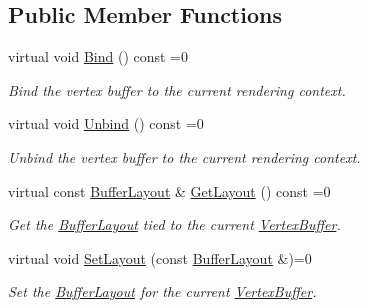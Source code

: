 \subsection*{Public Member Functions}
\begin{DoxyCompactItemize}
\item 
virtual void \hyperlink{classengine_1_1renderer_1_1VertexBuffer_a62c7bd816aa10b69d1e903918ecc4414}{Bind} () const =0
\begin{DoxyCompactList}\small\item\em Bind the vertex buffer to the current rendering context. \end{DoxyCompactList}\item 
virtual void \hyperlink{classengine_1_1renderer_1_1VertexBuffer_a06b240b93506dfd383b3a3f8947eb26f}{Unbind} () const =0
\begin{DoxyCompactList}\small\item\em Unbind the vertex buffer to the current rendering context. \end{DoxyCompactList}\item 
\mbox{\label{classengine_1_1renderer_1_1VertexBuffer_a3186b40aa8c8c471fe80c29645859aa5}} 
virtual const \hyperlink{classengine_1_1renderer_1_1BufferLayout}{Buffer\+Layout} \& \hyperlink{classengine_1_1renderer_1_1VertexBuffer_a3186b40aa8c8c471fe80c29645859aa5}{Get\+Layout} () const =0
\begin{DoxyCompactList}\small\item\em Get the \hyperlink{classengine_1_1renderer_1_1BufferLayout}{Buffer\+Layout} tied to the current \hyperlink{classengine_1_1renderer_1_1VertexBuffer}{Vertex\+Buffer}. \end{DoxyCompactList}\item 
\mbox{\label{classengine_1_1renderer_1_1VertexBuffer_afad191b22fec9bc2519e43d543e5c75e}} 
virtual void \hyperlink{classengine_1_1renderer_1_1VertexBuffer_afad191b22fec9bc2519e43d543e5c75e}{Set\+Layout} (const \hyperlink{classengine_1_1renderer_1_1BufferLayout}{Buffer\+Layout} \&)=0
\begin{DoxyCompactList}\small\item\em Set the \hyperlink{classengine_1_1renderer_1_1BufferLayout}{Buffer\+Layout} for the current \hyperlink{classengine_1_1renderer_1_1VertexBuffer}{Vertex\+Buffer}. \end{DoxyCompactList}\end{DoxyCompactItemize}
